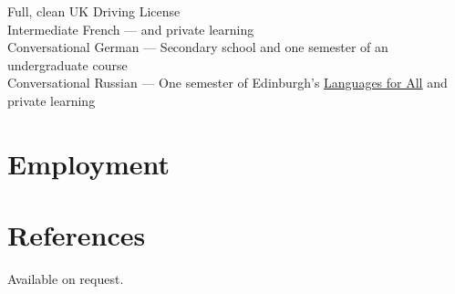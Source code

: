 \documentclass[10pt]{article}
\begin{document}
        {
            Full, clean UK Driving License\\
            Intermediate French ---   and private learning\\
            Conversational German --- Secondary school and one semester of an undergraduate course\\
            Conversational Russian --- One semester of Edinburgh's \href{http://www.ed.ac.uk/studying/short-courses/languages/for-all}{Languages for All} and private learning
        }

    \section{Employment}




    \section{References}

        Available on request.
\end{document}
